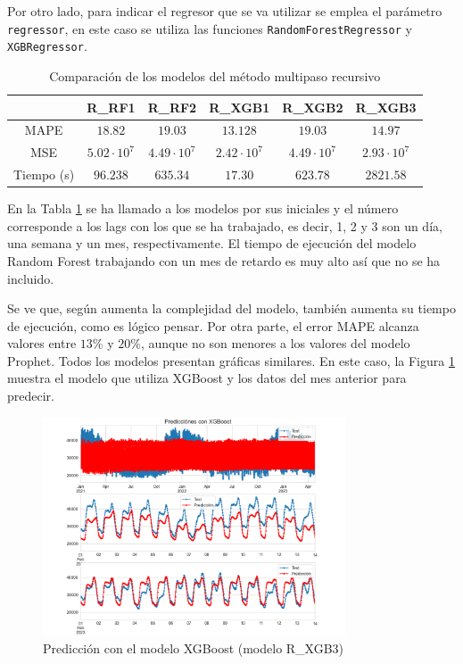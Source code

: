 \documentclass[12pt,twoside]{article}
\begin{document}
Por otro lado, para indicar el regresor que se va utilizar se emplea el parámetro \texttt{regressor}, en este caso se utiliza las funciones \texttt{RandomForestRegressor} y \texttt{XGBRegressor}.


\begin{table}[h] 
\centering
\begin{tabular}{cccccc} \hline
& R\_RF1 & R\_RF2 & R\_XGB1 & R\_XGB2 & R\_XGB3 \\ \hline
MAPE   & $18.82$ &  $19.03$ & $13.128$ & $19.03$ & $14.97$  \\ 
MSE    & $5.02\cdot10^7$ &  $4.49\cdot10^7$ & $2.42\cdot10^7$ & $4.49\cdot10^7$ & $2.93\cdot10^7$ \\
Tiempo (s) & $96.238$  & $635.34$ & $17.30$ & $623.78$ & $2821.58$ \\ \hline
\end{tabular}
\caption{Comparación de los modelos del método multipaso recursivo} \label{tab:comp_autoreg}
\end{table}

En la Tabla \ref{tab:comp_autoreg} se ha llamado a los modelos por sus iniciales y el número corresponde a los lags con los que se ha trabajado, es decir, 1, 2 y 3 son un día, una semana y un mes, respectivamente. El tiempo de ejecución del modelo Random Forest trabajando con un mes de retardo es muy alto así que no se ha incluido. 

Se ve que, según aumenta la complejidad del modelo, también aumenta su tiempo de ejecución, como es lógico pensar. Por otra parte, el error MAPE alcanza valores entre $13\%$ y $20\%$, aunque no son menores a los valores del modelo Prophet. Todos los modelos presentan gráficas similares. En este caso, la Figura \ref{fig:XGBoost} muestra el modelo que utiliza XGBoost y los datos del mes anterior para predecir. 
\begin{figure}[h]
\centering
    \includegraphics[width = 0.8\textwidth]{imagenes/XGBoost.png}
    \caption{Predicción con el modelo XGBoost (modelo R\_XGB3)}\label{fig:XGBoost}
\end{figure}
\end{document}
